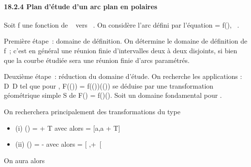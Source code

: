 \documentclass[]{article}
\begin{document}
\paragraph{18.2.4 Plan d'étude d'un arc plan en polaires}

Soit f une fonction de ~ vers ~. On considère l'arc défini par
l'équation \rho = f(\theta), \theta \in {}~.

Première étape~: domaine de définition. On détermine le domaine de
définition de f~; c'est en général une réunion finie d'intervalles deux
à deux disjoints, si bien que la courbe étudiée sera une réunion finie
d'arcs paramétrés.

Deuxième étape~: réduction du domaine d'étude. On recherche les
applications \sigma : D\rightarrow~D tel que pour \theta \inD, F(\sigma(\theta)) =
f(\sigma(\theta))\vecu(\sigma(\theta)) se déduise par une transformation
géométrique simple S de F(\theta) = f(\theta)\vecu(\theta). Soit \Delta
un domaine fondamental pour \sigma.

On recherchera principalement des transformations \theta du type

\begin{itemize}
\itemsep1pt\parskip0pt
\item
  (i) \sigma(\theta) = \theta + T avec alors \Delta = [a,a + T] \bigcapD
\item
  (ii) \sigma(\theta) = \omega - \theta avec alors \Delta = [ \omega {}
  ,+\infty~[\bigcapD
\end{itemize}

On aura alors
\end{document}
